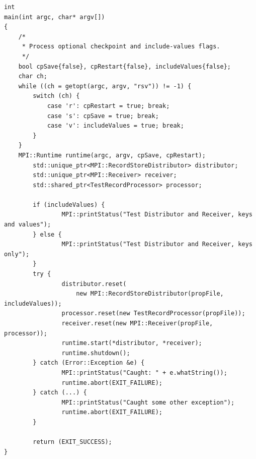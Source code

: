 \begin{lstlisting}[caption={MPI Framework Application Main}, label=lst:mpiappmain]
int
main(int argc, char* argv[])
{
	/*
	 * Process optional checkpoint and include-values flags.
	 */
	bool cpSave{false}, cpRestart{false}, includeValues{false};
	char ch;
	while ((ch = getopt(argc, argv, "rsv")) != -1) {
		switch (ch) {
			case 'r': cpRestart = true; break;
			case 's': cpSave = true; break;
			case 'v': includeValues = true; break;
		}
	}
	MPI::Runtime runtime(argc, argv, cpSave, cpRestart);
        std::unique_ptr<MPI::RecordStoreDistributor> distributor;
        std::unique_ptr<MPI::Receiver> receiver;
        std::shared_ptr<TestRecordProcessor> processor;

        if (includeValues) {
                MPI::printStatus("Test Distributor and Receiver, keys and values");
        } else {
                MPI::printStatus("Test Distributor and Receiver, keys only");
        }
        try {
                distributor.reset(
                    new MPI::RecordStoreDistributor(propFile, includeValues));
                processor.reset(new TestRecordProcessor(propFile));
                receiver.reset(new MPI::Receiver(propFile, processor));
                runtime.start(*distributor, *receiver);
                runtime.shutdown();
        } catch (Error::Exception &e) {
                MPI::printStatus("Caught: " + e.whatString());
                runtime.abort(EXIT_FAILURE);
        } catch (...) {
                MPI::printStatus("Caught some other exception");
                runtime.abort(EXIT_FAILURE);
        }

        return (EXIT_SUCCESS);
}

\end{lstlisting}
